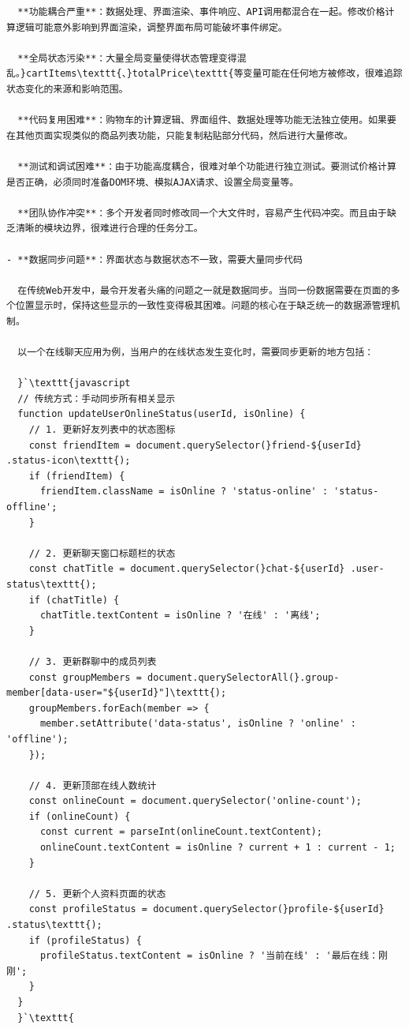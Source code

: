 {{\begin{lstlisting}
  **功能耦合严重**：数据处理、界面渲染、事件响应、API调用都混合在一起。修改价格计算逻辑可能意外影响到界面渲染，调整界面布局可能破坏事件绑定。

  **全局状态污染**：大量全局变量使得状态管理变得混乱。}cartItems\texttt{、}totalPrice\texttt{等变量可能在任何地方被修改，很难追踪状态变化的来源和影响范围。

  **代码复用困难**：购物车的计算逻辑、界面组件、数据处理等功能无法独立使用。如果要在其他页面实现类似的商品列表功能，只能复制粘贴部分代码，然后进行大量修改。

  **测试和调试困难**：由于功能高度耦合，很难对单个功能进行独立测试。要测试价格计算是否正确，必须同时准备DOM环境、模拟AJAX请求、设置全局变量等。

  **团队协作冲突**：多个开发者同时修改同一个大文件时，容易产生代码冲突。而且由于缺乏清晰的模块边界，很难进行合理的任务分工。

- **数据同步问题**：界面状态与数据状态不一致，需要大量同步代码

  在传统Web开发中，最令开发者头痛的问题之一就是数据同步。当同一份数据需要在页面的多个位置显示时，保持这些显示的一致性变得极其困难。问题的核心在于缺乏统一的数据源管理机制。

  以一个在线聊天应用为例，当用户的在线状态发生变化时，需要同步更新的地方包括：

  }`\texttt{javascript
  // 传统方式：手动同步所有相关显示
  function updateUserOnlineStatus(userId, isOnline) {
    // 1. 更新好友列表中的状态图标
    const friendItem = document.querySelector(}friend-${userId} .status-icon\texttt{);
    if (friendItem) {
      friendItem.className = isOnline ? 'status-online' : 'status-offline';
    }
    
    // 2. 更新聊天窗口标题栏的状态
    const chatTitle = document.querySelector(}chat-${userId} .user-status\texttt{);
    if (chatTitle) {
      chatTitle.textContent = isOnline ? '在线' : '离线';
    }
    
    // 3. 更新群聊中的成员列表
    const groupMembers = document.querySelectorAll(}.group-member[data-user="${userId}"]\texttt{);
    groupMembers.forEach(member => {
      member.setAttribute('data-status', isOnline ? 'online' : 'offline');
    });
    
    // 4. 更新顶部在线人数统计
    const onlineCount = document.querySelector('online-count');
    if (onlineCount) {
      const current = parseInt(onlineCount.textContent);
      onlineCount.textContent = isOnline ? current + 1 : current - 1;
    }
    
    // 5. 更新个人资料页面的状态
    const profileStatus = document.querySelector(}profile-${userId} .status\texttt{);
    if (profileStatus) {
      profileStatus.textContent = isOnline ? '当前在线' : '最后在线：刚刚';
    }
  }
  }`\texttt{


\end{lstlisting}}}
